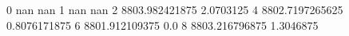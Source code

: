 0 nan nan
1 nan nan
2 8803.982421875 2.0703125
4 8802.7197265625 0.8076171875
6 8801.912109375 0.0
8 8803.216796875 1.3046875
